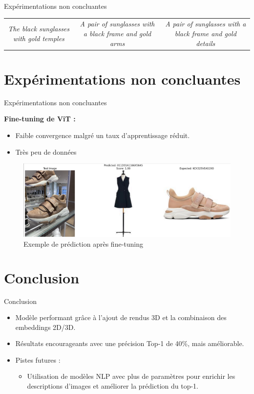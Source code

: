\documentclass{beamer}
\begin{document}
\begin{frame}{Expérimentations non concluantes}
\begin{table}[h]
{\begin{tabular}{c c c}
        \parbox{0.3\textwidth}{\centering \large \textit{The black sunglasses with gold temples}} & 
        \parbox{0.3\textwidth}{\centering \large \textit{A pair of sunglasses with a black frame and gold arms}} & 
        \parbox{0.3\textwidth}{\centering \large \textit{A pair of sunglasses with a black frame and gold details}} \\ 
    \end{tabular}%
    }
\end{table}
\end{frame}

\section{Expérimentations non concluantes}
\begin{frame}{Expérimentations non concluantes}
\item \textbf{Fine-tuning de ViT :}
\begin{itemize}
        \item Faible convergence malgré un taux d'apprentissage réduit.
        \item Très peu de données
\end{itemize}

\vspace{0.5cm}

\begin{figure}[h]
    \centering
    \includegraphics[width=1\textwidth]{assets/finetuning_vit.png}
    \caption{Exemple de prédiction après fine-tuning}
\end{figure}
\end{frame}



\section{Conclusion}
\begin{frame}{Conclusion}
\begin{itemize}
    \item Modèle performant grâce à l'ajout de rendus 3D et la combinaison des embeddings 2D/3D.
    \item Résultats encourageants avec une précision Top-1 de 40\%, mais améliorable.
    \item Pistes futures :
    \begin{itemize}
        \item Utilisation de modèles NLP avec plus de paramètres pour enrichir les descriptions d'images et améliorer la prédiction du top-1.
    \end{itemize}
\end{itemize}
\end{frame}
\end{document}
